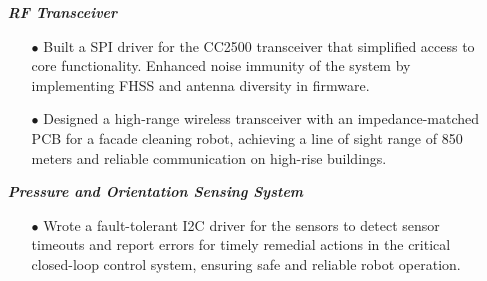 \documentclass[11pt]{article}
\begin{document}
\begin{itemize}[leftmargin=0.01in]\setlength\itemsep{-3pt}
  \item[]  \textbf{\emph{RF Transceiver}}
    \begin{itemize}\setlength{\itemsep}{0pt}\setlength{\parskip}{0pt}\vspace{-0.3em}
      \item[$\bullet$] Built a SPI driver for the CC2500 transceiver that simplified access to core functionality. Enhanced noise immunity of the system by implementing FHSS and antenna diversity in firmware.
      \item[$\bullet$] Designed a high-range wireless transceiver with an impedance-matched PCB for a facade cleaning robot, achieving a line of sight range of 850 meters and reliable communication on high-rise buildings.
    \end{itemize}
  \item[]  \textbf{\emph{Pressure and Orientation Sensing System}}
    \begin{itemize}\setlength{\itemsep}{0pt}\setlength{\parskip}{0pt}\vspace{-0.3em}
      \item[$\bullet$] Wrote a fault-tolerant I2C driver for the sensors to detect sensor timeouts and report errors for timely remedial actions in the critical closed-loop control system, ensuring safe and reliable robot operation.
   \end{itemize}





\end{itemize}
\end{document}
